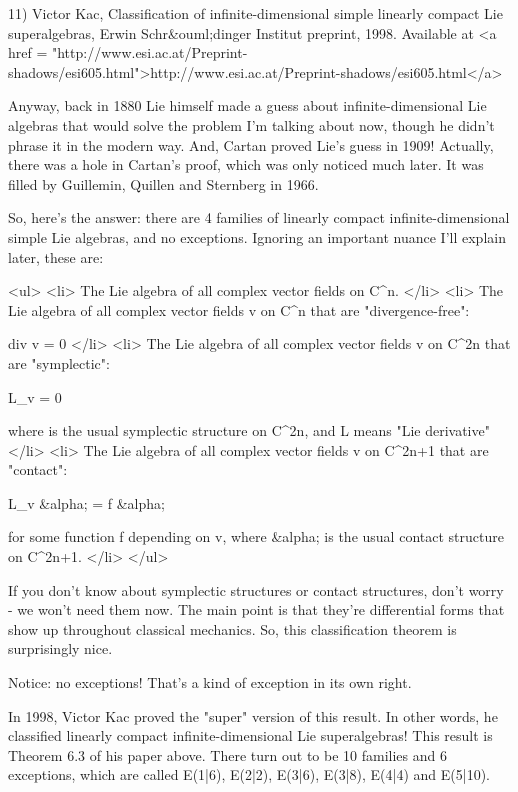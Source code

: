11) Victor Kac, Classification of infinite-dimensional simple 
linearly compact Lie superalgebras, Erwin Schr&ouml;dinger Institut 
preprint, 1998.
Available at <a href = "http://www.esi.ac.at/Preprint-shadows/esi605.html">http://www.esi.ac.at/Preprint-shadows/esi605.html</a>

Anyway, back in 1880 Lie himself made a guess about 
infinite-dimensional Lie algebras that would solve the problem 
I'm talking about now, though he didn't phrase it in the modern
way.  And, Cartan proved Lie's guess in 1909!  Actually, there 
was a hole in Cartan's proof, which was only noticed much later.  
It was filled by Guillemin, Quillen and Sternberg in 1966.

So, here's the answer: there are 4 families of linearly compact 
infinite-dimensional simple Lie algebras, and no exceptions.  
Ignoring an important nuance I'll explain later, these are:

<ul>
<li>
The Lie algebra of all complex vector fields on C^{n}.
</li>
<li>
The Lie algebra of all complex vector fields v on C^{n} 
that are "divergence-free":

    div v = 0
</li>
<li>
The Lie algebra of all complex vector fields v on C^{2n}
 that are "symplectic":

    L_{v} \omega  = 0

    where \omega  is the usual symplectic structure on C^{2n}, 
    and L means "Lie derivative"
</li>
<li>
The Lie algebra of all complex vector fields v on C^{2n+1} 
    that are "contact":

    L_{v} &alpha; = f &alpha;

    for some function f depending on v, where &alpha; is the usual
    contact structure on C^{2n+1}.
</li>
</ul>

If you don't know about symplectic structures or contact 
structures, don't worry - we won't need them now.  The main point 
is that they're differential forms that show up throughout 
classical mechanics.  So, this classification theorem is 
surprisingly nice.  

Notice: no exceptions!  That's a kind of exception in its own 
right. 

In 1998, Victor Kac proved the "super" version of this result.  
In other words, he classified linearly compact infinite-dimensional 
Lie superalgebras!  This result is Theorem 6.3 of his paper above.  
There turn out to be 10 families and 6 exceptions, which are 
called E(1|6), E(2|2), E(3|6), E(3|8), E(4|4) and E(5|10).

